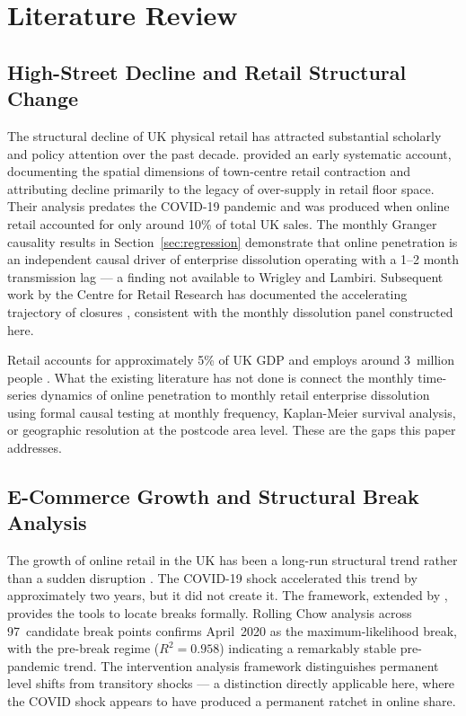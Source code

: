 \documentclass[12pt,a4paper]{article}
\begin{document}
\section{Literature Review}
\label{sec:lit}

\subsection{High-Street Decline and Retail Structural Change}

The structural decline of UK physical retail has attracted substantial scholarly and policy
attention over the past decade. \citet{WrigleyLambiri2015} provided an early systematic
account, documenting the spatial dimensions of town-centre retail contraction and
attributing decline primarily to the legacy of over-supply in retail floor space.
Their analysis predates the COVID-19 pandemic and was produced when online retail
accounted for only around 10\% of total UK sales. The monthly Granger causality results
in Section~\ref{sec:regression} demonstrate that online penetration is an independent
causal driver of enterprise dissolution operating with a 1--2 month transmission lag ---
a finding not available to Wrigley and Lambiri. Subsequent work by the Centre for Retail
Research has documented the accelerating trajectory of closures \citep{CentreRetailResearch2025},
consistent with the monthly dissolution panel constructed here.

Retail accounts for approximately 5\% of UK GDP and employs around 3~million people
\citep{HouseOfCommons2025}. What the existing literature has not done is connect the
monthly time-series dynamics of online penetration to monthly retail enterprise dissolution
using formal causal testing at monthly frequency, Kaplan-Meier survival analysis, or
geographic resolution at the postcode area level. These are the gaps this paper addresses.

\subsection{E-Commerce Growth and Structural Break Analysis}

The growth of online retail in the UK has been a long-run structural trend rather than a
sudden disruption \citep{OFT2007}. The COVID-19 shock accelerated this trend by
approximately two years, but it did not create it. The \citet{Chow1960} framework,
extended by \citet{BaiPerron1998}, provides the tools to locate breaks formally.
Rolling Chow analysis across 97~candidate break points confirms April~2020 as the
maximum-likelihood break, with the pre-break regime ($R^2=0.958$) indicating a remarkably
stable pre-pandemic trend. The intervention analysis framework \citep{BoxTiao1975}
distinguishes permanent level shifts from transitory shocks --- a distinction directly
applicable here, where the COVID shock appears to have produced a permanent ratchet in
online share.
\end{document}
